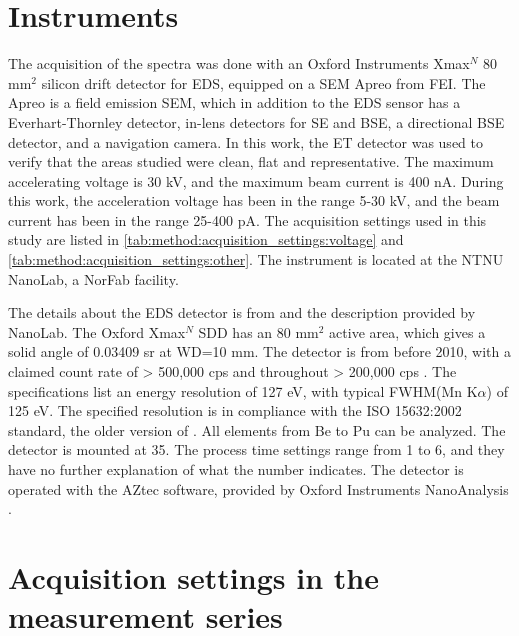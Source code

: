 \section{Instruments}
\label{method:instruments}

The acquisition of the spectra was done with an Oxford Instruments Xmax$^N$ 80 mm$^2$ silicon drift detector for EDS, equipped on a SEM Apreo from FEI.
The Apreo is a field emission SEM, which in addition to the EDS sensor has a Everhart-Thornley detector, in-lens detectors for SE and BSE, a directional BSE detector, and a navigation camera.
In this work, the ET detector was used to verify that the areas studied were clean, flat and representative.
The maximum accelerating voltage is 30 kV, and the maximum beam current is 400 nA.
During this work, the acceleration voltage has been in the range 5-30 kV, and the beam current has been in the range 25-400 pA.
The acquisition settings used in this study are listed in \cref{tab:method:acquisition_settings:voltage} and \cref{tab:method:acquisition_settings:other}.
The instrument is located at the NTNU NanoLab, a NorFab facility.

The details about the EDS detector is from \cite{oxford_xmax_80} and the description provided by NanoLab.
The Oxford Xmax$^N$ SDD has an 80 mm$^2$ active area, which gives a solid angle of 0.03409 sr at WD=10 mm.
The detector is from before 2010, with a claimed count rate of > 500,000 cps and throughout > 200,000 cps \cite{oxford_xmax_80}.
The specifications list an energy resolution of 127 eV, with typical FWHM(Mn K$\alpha$) of 125 eV.
The specified resolution is in compliance with the ISO 15632:2002 standard, the older version of \cite{iso_qc_15632}.
All elements from Be to Pu can be analyzed.
The detector is mounted at 35\textdegree.
The process time settings range from 1 to 6, and they have no further explanation of what the number indicates.
The detector is operated with the AZtec software, provided by Oxford Instruments NanoAnalysis \cite{aztec_manual}.



\section{Acquisition settings in the measurement series}
\label{method:acquisition_settings}

